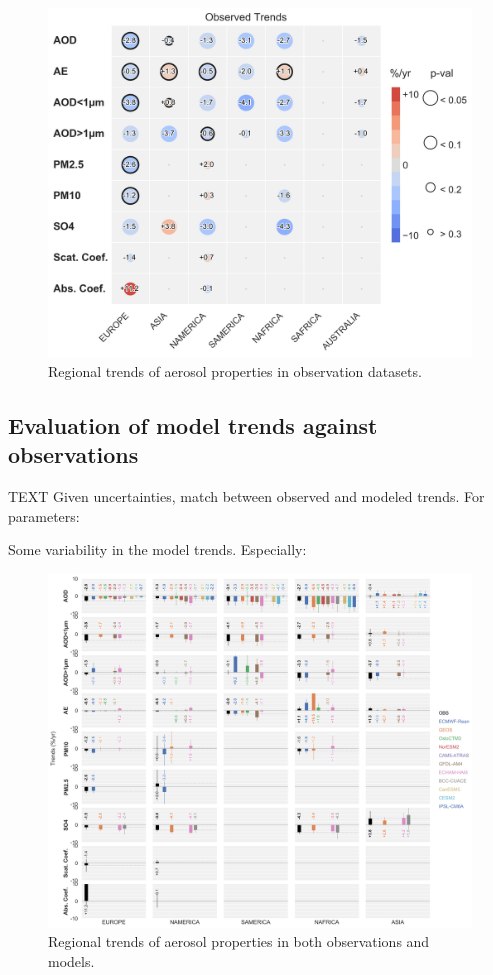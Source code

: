 \documentclass[journal abbreviation, manuscript]{copernicus}
\begin{document}
\begin{figure}
 \includegraphics[width=\columnwidth]{../scripts/figs/heatmaps/OBS.png}
 \caption{Regional trends of aerosol properties in observation datasets.}
 \label{obs_trends}
\end{figure}


\subsection{Evaluation of model trends against observations}
TEXT
Given uncertainties, match between observed and modeled trends. For parameters:

Some variability in the model trends. Especially:


\begin{figure}
 \includegraphics[width=\columnwidth]{../scripts/figs/heatmaps/BARS.png}
 \caption{Regional trends of aerosol properties in both observations and models.}
 \label{bars}
\end{figure}
\end{document}
